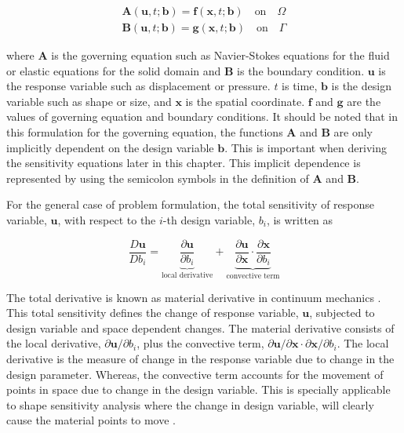 \begin{subequations}
\begin{gather}
	\mathbf{A}(\mathbf{u}, t; \mathbf{b}) = \mathbf{f}(\mathbf{x}, t; \mathbf{b})
	\quad \text{on} \quad \Omega
	\\
	\mathbf{B}(\mathbf{u}, t; \mathbf{b}) = \mathbf{g}(\mathbf{x}, t; \mathbf{b})	
	\quad \text{on} \quad \Gamma
\end{gather}\label{eq:C2_governingEquationAndBC}
\end{subequations}

where $\mathbf{A}$ is the governing equation such as Navier-Stokes equations for the fluid or elastic equations for the solid domain and $\mathbf{B}$ is the boundary condition. $\mathbf{u}$ is the response variable such as displacement or pressure. $t$ is time, $\mathbf{b}$ is the design variable such as shape or size, and $\mathbf{x}$ is the spatial coordinate. $\mathbf{f}$ and $\mathbf{g}$ are the values of governing equation and boundary conditions. It should be noted that in this formulation for the governing equation, the functions $\mathbf{A}$ and $\mathbf{B}$ are only implicitly dependent on the design variable $\mathbf{b}$. This is important when deriving the sensitivity equations later in this chapter. This implicit dependence is represented by using the semicolon symbols in the definition of $\mathbf{A}$ and $\mathbf{B}$.

For the general case of problem formulation, the total sensitivity of response variable, $\mathbf{u}$, with respect to the $i$-th design variable, $b_i$, is written as

\begin{equation}\label{eq:C2_totalSensitivityDef}
	\frac{D \mathbf{u}}{D b_i} = 
	\underbrace{\frac{\partial \mathbf{u}}{\partial b_i}}_\text{local derivative} + 
	\underbrace{\frac{\partial \mathbf{u}}{\partial \mathbf{x}} \cdot
	\frac{\partial \mathbf{x}}{\partial b_i}}_\text{convective term}
\end{equation}

The total derivative is known as material derivative in continuum mechanics \cite{mase2009continuum}. This total sensitivity defines the change of response variable, $\mathbf{u}$, subjected to design variable and space dependent changes. The material derivative consists of the local derivative, $\partial \mathbf{u}/\partial b_i$, plus the convective term, $\partial \mathbf{u}/\partial \mathbf{x} \cdot \partial \mathbf{x}/\partial b_i$. The local derivative is the measure of change in the response variable due to change in the design parameter. Whereas, the convective term accounts for the movement of points in space due to change in the design variable. This is specially applicable to shape sensitivity analysis where the change in design variable, will clearly cause the material points to move \cite{cross2014local}.

